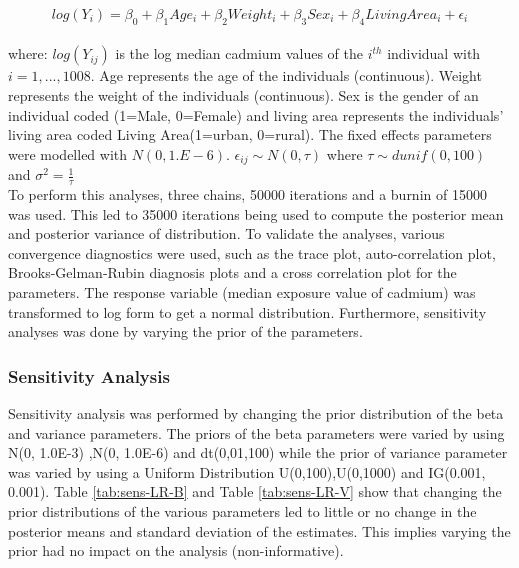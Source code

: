 \documentclass[11pt]{article}
\begin{document}
$$log(Y_{i}) = \beta_{0} +  \beta_{1}Age_{i} + \beta_{2}Weight_{i} + \beta_{3}Sex_{i} +\beta_{4}Living Area_{i} + \epsilon_{i} $$
\\
where: $log(Y_{ij})$ is the log median cadmium values of the $i^{th}$  individual with $i=1,...,1008$. Age represents the age of the individuals (continuous). Weight represents the weight of the individuals (continuous). Sex is the gender of an individual coded (1=Male, 0=Female) and living area represents the individuals' living area coded Living Area(1=urban, 0=rural). The fixed effects parameters were modelled with $N(0,1.E-6)$.
$\epsilon_{ij} \sim N(0, \tau)$ where $\tau  \sim dunif(0,100)$ and $\sigma^{2} = \frac{1}{\tau}$  
\\
To perform this analyses, three chains, 50000 iterations and a burnin of 15000 was used. This led to 35000 iterations being used to compute the posterior mean and posterior variance of distribution. To validate the analyses, various convergence diagnostics were used, such as the trace plot, auto-correlation plot, Brooks-Gelman-Rubin diagnosis plots and a cross correlation plot for the parameters. The response variable (median exposure value of cadmium) was transformed to log form to get a normal distribution. Furthermore,  sensitivity analyses was done by varying the prior of the parameters.
\subsubsection{Sensitivity Analysis}




 Sensitivity analysis was performed by changing the prior distribution of the beta and variance parameters. The priors of the  beta parameters were varied by using  N(0, 1.0E-3) ,N(0, 1.0E-6) and dt(0,01,100) while the prior of variance parameter was varied by using a Uniform Distribution U(0,100),U(0,1000) and IG(0.001, 0.001). Table \ref{tab:sens-LR-B} and Table \ref{tab:sens-LR-V} show that changing the prior distributions of the various parameters led to little or no change in the posterior means and standard deviation of the estimates. This implies varying the prior had no impact on the analysis (non-informative). 
\end{document}
